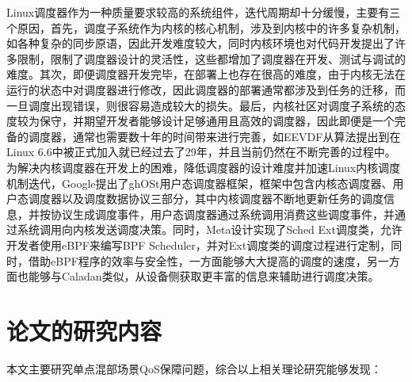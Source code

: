 Linux调度器作为一种质量要求较高的系统组件，迭代周期却十分缓慢，主要有三个原因，首先，调度子系统作为内核的核心机制，涉及到内核中的许多复杂机制，如各种复杂的同步原语，因此开发难度较大，同时内核环境也对代码开发提出了许多限制，限制了调度器设计的灵活性，这些都增加了调度器在开发、测试与调试的难度\citep{humphries2021ghost}。其次，即便调度器开发完毕，在部署上也存在很高的难度，由于内核无法在运行的状态中对调度器进行修改，因此调度器的部署通常都涉及到任务的迁移，而一旦调度出现错误，则很容易造成较大的损失。最后，内核社区对调度子系统的态度较为保守，并期望开发者能够设计足够通用且高效的调度器，因此即便是一个完备的调度器，通常也需要数十年的时间带来进行完善\citep{agache2020firecracker}，如EEVDF从算法提出到在Linux 6.6中被正式加入就已经过去了29年，并且当前仍然在不断完善的过程中。为解决内核调度器在开发上的困难，降低调度器的设计难度并加速Linux内核调度机制迭代，Google提出了ghOSt\citep{humphries2021ghost}用户态调度器框架，框架中包含内核态调度器、用户态调度器以及调度数据协议三部分，其中内核调度器不断地更新任务的调度信息，并按协议生成调度事件，用户态调度器通过系统调用消费这些调度事件，并通过系统调用向内核发送调度决策。同时，Meta设计实现了Sched Ext调度类，允许开发者使用eBPF来编写BPF Scheduler，并对Ext调度类的调度过程进行定制，同时，借助eBPF程序的效率与安全性，一方面能够大大提高的调度的速度，另一方面也能够与Caladan类似，从设备侧获取更丰富的信息来辅助进行调度决策。
 
\section{论文的研究内容}

本文主要研究单点混部场景QoS保障问题，综合以上相关理论研究能够发现：


